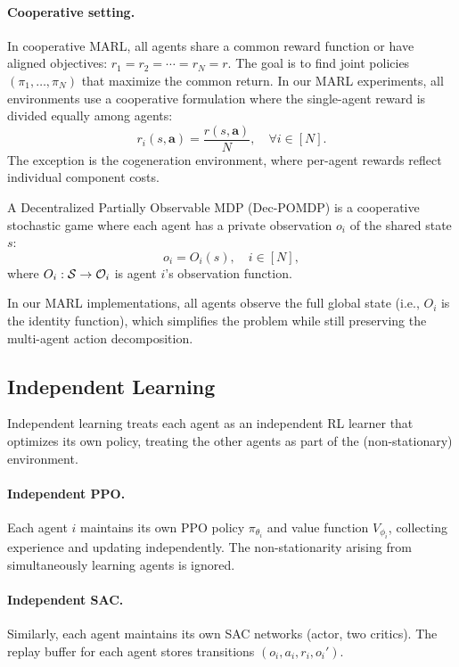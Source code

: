 \paragraph{Cooperative setting.} In cooperative MARL, all agents share a common reward function or have aligned objectives: $r_1 = r_2 = \cdots = r_N = r$. The goal is to find joint policies $(\pi_1, \ldots, \pi_N)$ that maximize the common return. In our MARL experiments, all environments use a cooperative formulation where the single-agent reward is divided equally among agents:
\begin{equation}
    r_i(s, \mathbf{a}) = \frac{r(s, \mathbf{a})}{N}, \quad \forall i \in [N].
    \label{eq:shared_reward}
\end{equation}
The exception is the cogeneration environment, where per-agent rewards reflect individual component costs.

\begin{definition}
A Decentralized Partially Observable MDP (Dec-POMDP) is a cooperative stochastic game where each agent has a private observation $o_i$ of the shared state $s$:
\begin{equation}
    o_i = O_i(s), \quad i \in [N],
\end{equation}
where $O_i: \mathcal{S} \to \mathcal{O}_i$ is agent $i$'s observation function.
\end{definition}

In our MARL implementations, all agents observe the full global state (i.e., $O_i$ is the identity function), which simplifies the problem while still preserving the multi-agent action decomposition.

\subsection{Independent Learning}

Independent learning treats each agent as an independent RL learner that optimizes its own policy, treating the other agents as part of the (non-stationary) environment.

\paragraph{Independent PPO.} Each agent $i$ maintains its own PPO policy $\pi_{\theta_i}$ and value function $V_{\phi_i}$, collecting experience and updating independently. The non-stationarity arising from simultaneously learning agents is ignored.

\paragraph{Independent SAC.} Similarly, each agent maintains its own SAC networks (actor, two critics). The replay buffer for each agent stores transitions $(o_i, a_i, r_i, o_i')$.

